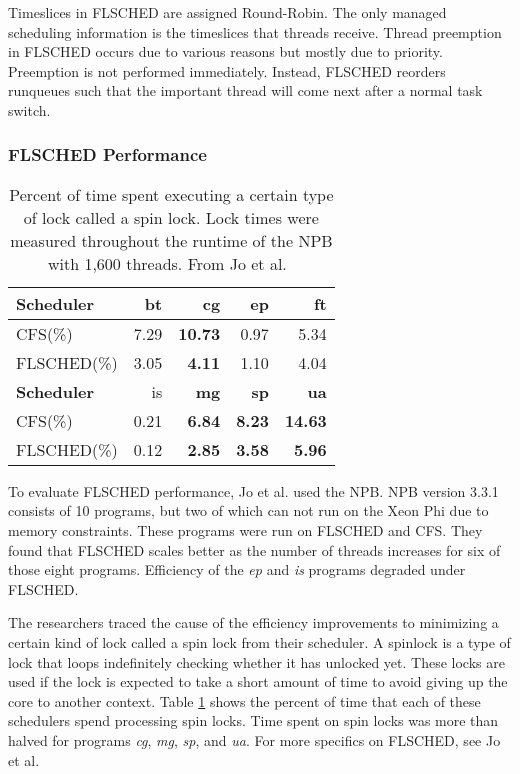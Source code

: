 \documentclass{sig-alternate}
\begin{document}
Timeslices in FLSCHED are assigned Round-Robin. The only managed scheduling information is the timeslices that threads receive. Thread preemption in FLSCHED occurs due to various reasons but mostly due to priority. Preemption is not performed immediately. Instead, FLSCHED reorders runqueues such that the important thread will come next after a normal task switch.~\cite{Jo:2017}


\subsubsection{FLSCHED Performance}
\label{sec:flsched_performance}


\begin{table}
	\begin{center}
	\begin{tabular}{ l | r | r | r | r }
		\textbf{Scheduler} & bt & \textbf{cg} & ep & ft \\ \hline
		CFS(\%) & 7.29 & \textbf{10.73} & 0.97 & 5.34 \\
		FLSCHED(\%) & 3.05 & \textbf{4.11} & 1.10 & 4.04
		\vspace{0.2cm}
		 \\ %
		\textbf{Scheduler} & is & \textbf{mg} & \textbf{sp} & \textbf{ua} \\ \hline
		CFS(\%) & 0.21 & \textbf{6.84} & \textbf{8.23} & \textbf{14.63} \\
		FLSCHED(\%) & 0.12 & \textbf{2.85} & \textbf{3.58} & \textbf{5.96} \\ %
	\end{tabular}
\end{center}
	\caption{ Percent of time spent executing a certain type of lock called a spin lock. Lock times were measured throughout the runtime of the NPB with 1,600 threads. From Jo et al.~\cite{Jo:2017}}
	\label{fig:flsched_spinlock}
\end{table}

To evaluate FLSCHED performance, Jo et al. used the NPB. NPB version 3.3.1 consists of 10 programs, but two of which can not run on the Xeon Phi due to memory constraints. These programs were run on FLSCHED and CFS. They found that FLSCHED scales better as the number of threads increases for six of those eight programs. Efficiency of the \textit{ep} and \textit{is} programs degraded under FLSCHED.~\cite{Jo:2017}

The researchers traced the cause of the efficiency improvements to minimizing a certain kind of lock called a spin lock from their scheduler. A spinlock is a type of lock that loops indefinitely checking whether it has unlocked yet. These locks are used if the lock is expected to take a short amount of time to avoid giving up the core to another context. Table \ref{fig:flsched_spinlock} shows the percent of time that each of these schedulers spend processing spin locks. Time spent on spin locks was more than halved for programs \textit{cg}, \textit{mg}, \textit{sp}, and \textit{ua}. For more specifics on FLSCHED, see Jo et al.~\cite{Jo:2017}
\end{document}
